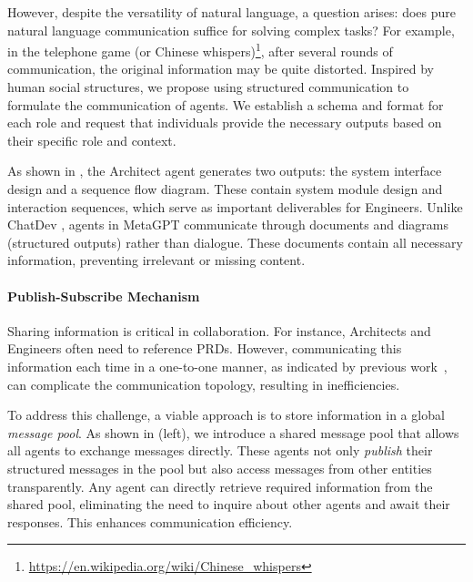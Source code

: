 However, despite the versatility of natural language, a question arises: does pure natural language communication suffice for solving complex tasks?
% 
For example, in the telephone game (or Chinese whispers)\footnote{\href{https://en.wikipedia.org/wiki/Chinese\_whispers}{https://en.wikipedia.org/wiki/Chinese\_whispers}}, after several rounds of communication, the original information may be quite distorted.
Inspired by human social structures, we propose using structured communication to formulate the communication of agents. We establish a schema and format for each role and request that individuals provide the necessary outputs based on their specific role and context.

As shown in , the Architect agent generates two outputs: the system interface design and a sequence flow diagram. These contain system module design and interaction sequences, which serve as important deliverables for Engineers.
%
Unlike ChatDev \citep{zhao2023chat}, agents in MetaGPT communicate through documents and diagrams (structured outputs) rather than dialogue. These documents contain all necessary information, preventing irrelevant or missing content.


\paragraph{Publish-Subscribe Mechanism}

Sharing information is critical in collaboration. 
For instance, Architects and Engineers often need to reference PRDs. However, communicating this information each time in a one-to-one manner, as indicated by previous work~\citep{li2023camel,zhao2023chat,zhang2023building}, can complicate the communication topology, resulting in inefficiencies. 

To address this challenge, a viable approach is to store information in a global \textit{message pool}. 
As shown in  (left), we introduce a shared message pool that allows all agents to exchange messages directly. These agents not only \textit{publish} their structured messages in the pool but also access messages from other entities transparently.
Any agent can directly retrieve required information from the shared pool, eliminating the need to inquire about other agents and await their responses. This enhances communication efficiency.

